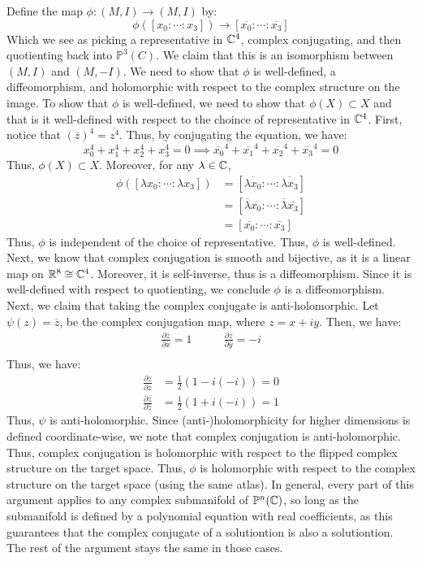 \documentclass[12pt]{article}
\begin{document}
\begin{solution}
    \bbni
    Define the map $\phi: (M, I) \to (M, I)$ by: 
    \[ \phi([x_0 : \cdots : x_3 ]) \to [\overline{x_0} : \cdots : \overline{x_3}]\]
    Which we see as picking a representative in $\mathbb C^4$, complex conjugating, and then quotienting back into $\mathbb{P}^3(C)$. We claim that this is an isomorphism between $(M, I)$ and $(M, -I)$. We need to show that $\phi$ is well-defined, a diffeomorphism, and holomorphic with respect to the complex structure on the image. \bbni
    To show that $\phi$ is well-defined, we need to show that $\phi(X) \subset X$ and that is it well-defined with respect to the choince of representative in $\mathbb C^4$. First, notice that $(\overline{z})^4 = \overline{z^4}$. Thus, by conjugating the equation, we have:
    \[ x_0^4 + x_1^4 + x_2^4 + x_3^4 = 0 \implies \overline{x_0}^4 + \overline{x_1}^4 + \overline{x_2}^4 + \overline{x_3}^4 = 0  \]
    Thus, $\phi(X) \subset X$. Moreover, for any $\lambda \in \mathbb C$, 
    \begin{align*}
        \phi([\lambda x_0 : \cdots : \lambda x_3]) &= [\overline{\lambda x_0}: \cdots : \overline{\lambda x_3}] \\
        &= [\overline{\lambda}\overline{x_0}: \cdots : \overline{\lambda} \overline{x_3}] \\
        &= [\overline{x_0}: \cdots : \overline{x_3}]
    \end{align*}
    Thus, $\phi$ is independent of the choice of representative. Thus, $\phi$ is well-defined. \bbni
    Next, we know that complex conjugation is smooth and bijective, as it is a linear map on $\mathbb R^8 \cong \mathbb C^4$. Moreover, it is self-inverse, thus is a diffeomorphism. Since it is well-defined with respect to quotienting, we conclude $\phi$ is a diffeomorphism. \bbni
    Next, we claim that taking the complex conjugate is anti-holomorphic. Let $\psi(z) = \overline{z}$, be the complex conjugation map, where $z = x + iy$. Then, we have:
    \begin{align*}
        \frac{\partial \overline{z}}{\partial x} = 1 & \qquad \frac{\partial \overline{z}}{\partial y} = -i \\
    \end{align*}
    Thus, we have:
    \begin{align*}
        \frac{\partial \overline{z}}{\partial z} &= \frac{1}{2}(1-i(-i)) = 0 \\
        \frac{\partial \overline{z}}{\partial \overline{z}} &= \frac{1}{2}(1+i(-i)) = 1
    \end{align*}
    Thus, $\psi$ is anti-holomorphic. Since (anti-)holomorphicity for higher dimensions is defined coordinate-wise, we note that complex conjugation is anti-holomorphic. Thus, complex conjugation is holomorphic with respect to the flipped complex structure on the target space. Thus, $\phi$ is holomorphic with respect to the complex structure on the target space (using the same atlas). \bbni 
    In general, every part of this argument applies to any complex submanifold of $\mathbb{P}^n(\mathbb C)$, so long as the submanifold is defined by a polynomial equation with real coefficients, as this guarantees that the complex conjugate of a solutiontion is also a solutiontion. The rest of the argument stays the same in those cases.
\end{solution}
\end{document}
